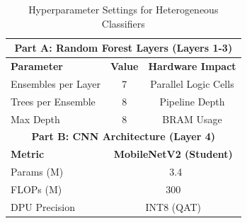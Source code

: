 \begin{table}[h]
    \centering
    \caption{Hyperparameter Settings for Heterogeneous Classifiers}
    \label{tab:hyperparams}
    \small
    \begin{tabular}{lcc}
        \toprule
        \multicolumn{3}{c}{\textbf{Part A: Random Forest Layers (Layers 1-3)}} \\
        \midrule
        \textbf{Parameter} & \textbf{Value} & \textbf{Hardware Impact} \\
        \midrule
        Ensembles per Layer & 7 & Parallel Logic Cells \\
        Trees per Ensemble & 8 & Pipeline Depth \\
        Max Depth & 8 & BRAM Usage \\
        \midrule
        \multicolumn{3}{c}{\textbf{Part B: CNN Architecture (Layer 4)}} \\
        \midrule
        \textbf{Metric} & \multicolumn{2}{c}{\textbf{MobileNetV2 (Student)}} \\
        \midrule
        Params (M) & \multicolumn{2}{c}{~3.4} \\
        FLOPs (M) & \multicolumn{2}{c}{300} \\
        DPU Precision & \multicolumn{2}{c}{INT8 (QAT)} \\
        \bottomrule
    \end{tabular}
\end{table}

